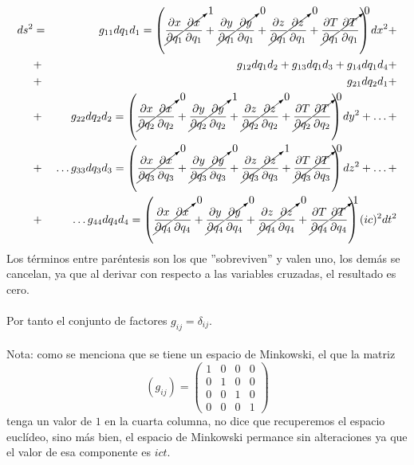 \begin{eqnarray*}
ds^{2} &=& g_{11} dq_{1}d_{1} = \left( \cancelto{1}{\dfrac{\partial x}{\partial q_{1}} \dfrac{\partial x}{\partial q_{1}}} + \cancelto{0}{\dfrac{\partial y}{\partial q_{1}} \dfrac{\partial y}{\partial q_{1}}} + \cancelto{0}{\dfrac{\partial z}{\partial q_{1}} \dfrac{\partial z}{\partial q_{1}}} + \cancelto{0}{\dfrac{\partial T}{\partial q_{1}} \dfrac{\partial T}{\partial q_{1}}} \right) d x^{2} + \\
&+& g_{12} dq_{1}d_{2} +  g_{13} dq_{1}d_{3} + g_{14} dq_{1}d_{4} + \\
&+& g_{21} dq_{2}d_{1} + \\
&+& g_{22} dq_{2}d_{2} = \left( \cancelto{0}{\dfrac{\partial x}{\partial q_{2}} \dfrac{\partial x}{\partial q_{2}}} + \cancelto{1}{\dfrac{\partial y}{\partial q_{2}} \dfrac{\partial y}{\partial q_{2}}} + \cancelto{0}{\dfrac{\partial z}{\partial q_{2}} \dfrac{\partial z}{\partial q_{2}}} + \cancelto{0}{\dfrac{\partial T}{\partial q_{2}} \dfrac{\partial T}{\partial q_{2}}} \right) d y^{2} + \ldots + \\
&+& \ldots g_{33} dq_{3}d_{3} = \left( \cancelto{0}{\dfrac{\partial x}{\partial q_{3}} \dfrac{\partial x}{\partial q_{3}}} + \cancelto{0}{\dfrac{\partial y}{\partial q_{3}} \dfrac{\partial y}{\partial q_{3}}} + \cancelto{1}{\dfrac{\partial z}{\partial q_{3}} \dfrac{\partial z}{\partial q_{3}}} + \cancelto{0}{\dfrac{\partial T}{\partial q_{3}} \dfrac{\partial T}{\partial q_{3}}} \right) d z^{2} + \ldots + \\
&+& \ldots g_{44} dq_{4}d_{4} = \left( \cancelto{0}{\dfrac{\partial x}{\partial q_{4}} \dfrac{\partial x}{\partial q_{4}}} + \cancelto{0}{\dfrac{\partial y}{\partial q_{4}} \dfrac{\partial y}{\partial q_{4}}} + \cancelto{0}{\dfrac{\partial z}{\partial q_{4}} \dfrac{\partial z}{\partial q_{4}}} + \cancelto{1}{\dfrac{\partial T}{\partial q_{4}} \dfrac{\partial T}{\partial q_{4}}} \right) (ic)^{2} d t^{2}
\end{eqnarray*}
Los términos entre paréntesis son los que ''sobreviven'' y valen uno, los demás se cancelan, ya que al derivar con respecto a las variables cruzadas, el resultado es cero.
\\
\\
Por tanto el conjunto de factores $g_{ij} = \delta_{ij}$.
\\
\\
Nota: como se menciona que se tiene un espacio de Minkowski, el que la matriz
\[ (g_{ij}) = \begin{pmatrix}
1 & 0 & 0 & 0 \\
0 & 1 & 0 & 0 \\
0 & 0 & 1 & 0 \\
0 & 0 & 0 & 1
\end{pmatrix} \]
tenga un valor de $1$ en la cuarta columna, no dice que recuperemos el espacio euclídeo, sino más bien, el espacio de Minkowski permance sin alteraciones ya que el valor de esa componente es $ict$.



















